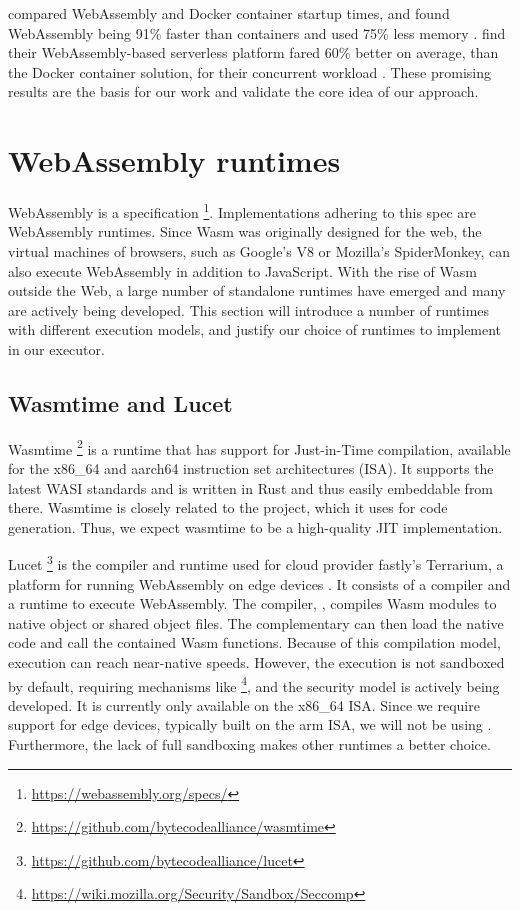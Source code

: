 \citeauthor{Mendki2020} compared WebAssembly and Docker container startup times, and found WebAssembly being 91\% faster than containers and used 75\% less memory \cite{Mendki2020}. \citeauthor{Hall2019} find their WebAssembly-based serverless platform fared 60\% better on average, than the Docker container solution, for their concurrent  workload \cite{Hall2019}. These promising results are the basis for our work and validate the core idea of our approach.


\section{WebAssembly runtimes}

WebAssembly is a specification \footnote{\url{https://webassembly.org/specs/}}. Implementations adhering to this spec are WebAssembly runtimes. Since Wasm was originally designed for the web, the virtual machines of browsers, such as Google's V8 or Mozilla's SpiderMonkey, can also execute WebAssembly in addition to JavaScript. With the rise of Wasm outside the Web, a large number of standalone runtimes have emerged and many are actively being developed. This section will introduce a number of runtimes with different execution models, and justify our choice of runtimes to implement in our executor.


\subsection{Wasmtime and Lucet}

Wasmtime \footnote{\url{https://github.com/bytecodealliance/wasmtime}} is a runtime that has support for Just-in-Time compilation, available for the x86\_64 and aarch64 instruction set architectures (ISA). It supports the latest WASI standards and is written in Rust and thus easily embeddable from there.
Wasmtime is closely related to the  project, which it uses for code generation. Thus, we expect wasmtime to be a high-quality JIT implementation.

Lucet \footnote{\url{https://github.com/bytecodealliance/lucet}} is the compiler and runtime used for cloud provider fastly's Terrarium, a platform for running WebAssembly on edge devices \cite{fastly2019}. It consists of a compiler and a runtime to execute WebAssembly. The compiler, , compiles Wasm modules to native object or shared object files. The complementary  can then load the native code and call the contained Wasm functions. Because of this compilation model, execution can reach near-native speeds. However, the execution is not sandboxed by default, requiring mechanisms like  \footnote{\url{https://wiki.mozilla.org/Security/Sandbox/Seccomp}}, and the security model is actively being developed. It is currently only available on the x86\_64 ISA. Since we require support for edge devices, typically built on the arm ISA, we will not be using . Furthermore, the lack of full sandboxing makes other runtimes a better choice.

